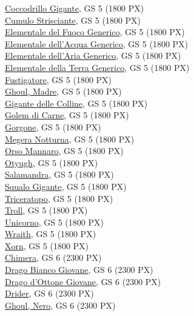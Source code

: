 \begin{multicols}{3}
{\hyperlink{Coccodrillo Gigante}{Coccodrillo Gigante}, GS 5 (1800 PX)\\
\hyperlink{Cumulo Strisciante}{Cumulo Strisciante}, GS 5 (1800 PX)\\
\hyperlink{Elementale del Fuoco Generico}{Elementale del Fuoco Generico}, GS 5 (1800 PX)\\
\hyperlink{Elementale dell'Acqua Generico}{Elementale dell'Acqua Generico}, GS 5 (1800 PX)\\
\hyperlink{Elementale dell'Aria Generico}{Elementale dell'Aria Generico}, GS 5 (1800 PX)\\
\hyperlink{Elementale della Terra Generico}{Elementale della Terra Generico}, GS 5 (1800 PX)\\
\hyperlink{Fustigatore}{Fustigatore}, GS 5 (1800 PX)\\
\hyperlink{Ghoul, Madre}{Ghoul, Madre}, GS 5 (1800 PX)\\
\hyperlink{Gigante delle Colline}{Gigante delle Colline}, GS 5 (1800 PX)\\
\hyperlink{Golem di Carne}{Golem di Carne}, GS 5 (1800 PX)\\
\hyperlink{Gorgone}{Gorgone}, GS 5 (1800 PX)\\
\hyperlink{Megera Notturna}{Megera Notturna}, GS 5 (1800 PX)\\
\hyperlink{Orso Mannaro}{Orso Mannaro}, GS 5 (1800 PX)\\
\hyperlink{Otyugh}{Otyugh}, GS 5 (1800 PX)\\
\hyperlink{Salamandra}{Salamandra}, GS 5 (1800 PX)\\
\hyperlink{Squalo Gigante}{Squalo Gigante}, GS 5 (1800 PX)\\
\hyperlink{Triceratopo}{Triceratopo}, GS 5 (1800 PX)\\
\hyperlink{Troll}{Troll}, GS 5 (1800 PX)\\
\hyperlink{Unicorno}{Unicorno}, GS 5 (1800 PX)\\
\hyperlink{Wraith}{Wraith}, GS 5 (1800 PX)\\
\hyperlink{Xorn}{Xorn}, GS 5 (1800 PX)\\
\hyperlink{Chimera}{Chimera}, GS 6 (2300 PX)\\
\hyperlink{Drago Bianco Giovane}{Drago Bianco Giovane}, GS 6 (2300 PX)\\
\hyperlink{Drago d'Ottone Giovane}{Drago d'Ottone Giovane}, GS 6 (2300 PX)\\
\hyperlink{Drider}{Drider}, GS 6 (2300 PX)\\
\hyperlink{Ghoul, Nero}{Ghoul, Nero}, GS 6 (2300 PX)\\
}
\end{multicols}
